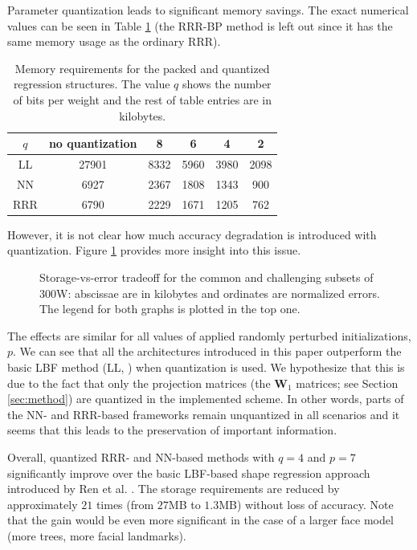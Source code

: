 \documentclass{article}
\begin{document}
		Parameter quantization leads to significant memory savings.
		The exact numerical values can be seen in Table \ref{tbl:qmem} (the RRR-BP method is left out since it has the same memory usage as the ordinary RRR).
		\begin{table}
			\centering
			\resizebox{0.4\textwidth}{!}
			{
			\begin{tabular}{| c || c | c | c | c | c |}
				\hline
				$q$	&	no quantization	&	8	&	6	&	4	&	2	\\
				\hline
				\hline
				LL	&	27901	&	8332	&	5960	&	3980	&	2098	\\
				\hline
				NN	&	6927	&	2367	&	1808	&	1343	&	900	\\
				\hline
				RRR	&	6790	&	2229	&	1671	&	1205	&	762	\\
				\hline
			\end{tabular}
			}
			\caption
			{
				Memory requirements for the packed and quantized regression structures.
				The value $q$ shows the number of bits per weight and the rest of table entries are in kilobytes.
			}
			\label{tbl:qmem}
		\end{table}
		However, it is not clear how much accuracy degradation is introduced with quantization.
		Figure \ref{fig:mem-vs-err} provides more insight into this issue.
		\begin{figure}[t]
			\centering
			
			\caption
			{
				\small
				Storage-vs-error tradeoff for the common and challenging subsets of 300W:
				abscissae are in kilobytes and ordinates are normalized errors.
				The legend for both graphs is plotted in the top one.
			}
			\label{fig:mem-vs-err}
		\end{figure}
		The effects are similar for all values of applied randomly perturbed initializations, $p$.
		We can see that all the architectures introduced in this paper outperform the basic LBF method (LL, \cite{lbf}) when quantization is used.
		We hypothesize that this is due to the fact that only the projection matrices (the $\mathbf{W}_1$ matrices; see Section \ref{sec:method}) are quantized in the implemented scheme.
		In other words, parts of the NN- and RRR-based frameworks remain unquantized in all scenarios and it seems that this leads to the preservation of important information.

		Overall, quantized RRR- and NN-based methods with $q=4$ and $p=7$ significantly improve over the basic LBF-based shape regression approach introduced by Ren et al. \cite{lbf}.
		The storage requirements are reduced by approximately $21$ times (from $27$MB to $1.3$MB) without loss of accuracy.
		Note that the gain would be even more significant in the case of a larger face model (more trees, more facial landmarks).
\end{document}
